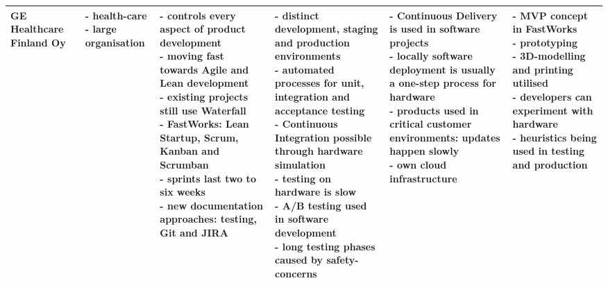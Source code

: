 \documentclass[english]{tktltiki2}
\begin{document}
\begin{landscape}
\begin{longtable}{|p{2.5cm}|p{1.5cm}|p{4cm}|p{4cm}|p{4cm}|p{4cm}|}
        GE Healthcare Finland Oy &
        \parbox[t]{1.5cm}{- health-care \\
                          - large organisation} &
        \parbox[t]{4cm}{- controls every aspect of product development \\
                        - moving fast towards Agile and Lean development \\
                        - existing projects still use Waterfall \\
                        - FastWorks: Lean Startup, Scrum, Kanban and Scrumban \\
                        - sprints last two to six weeks \\
                        - new documentation approaches: testing, Git and JIRA} &
        \parbox[t]{4cm}{- distinct development, staging and production environments \\
                        - automated processes for unit, integration and acceptance testing \\
                        - Continuous Integration possible through hardware simulation \\
                        - testing on hardware is slow \\
                        - A/B testing used in software development \\
                        - long testing phases caused by safety-concerns} &
        \parbox[t]{4cm}{- Continuous Delivery is used in software projects \\
                        - locally software deployment is usually a one-step process for hardware \\
                        - products used in critical customer environments: updates happen slowly \\
                        - own cloud infrastructure} &
        \parbox[t]{4cm}{- MVP concept in FastWorks \\
                        - prototyping \\
                        - 3D-modelling and printing utilised \\
                        - developers can experiment with hardware \\
                        - heuristics being used in testing and production} \\

        \hline


\end{longtable}
\end{landscape}
\end{document}
